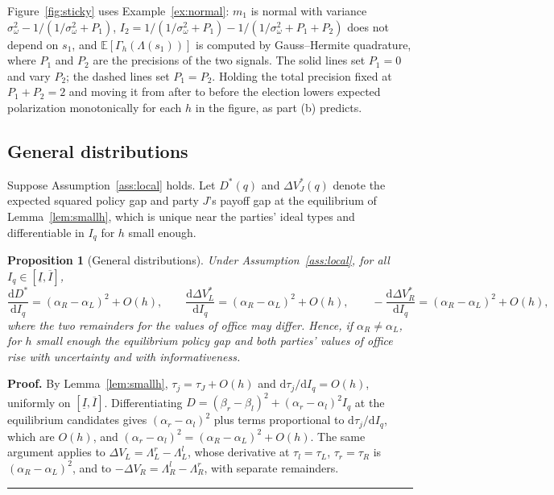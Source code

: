 \documentclass[12pt,letterpaper]{article}
\newtheorem{proposition}{Proposition}
\newenvironment{proof}[1][Proof]{\noindent\textbf{#1.} }{\ \rule{0.5em}{0.5em}}
\begin{document}
Figure~\ref{fig:sticky} uses Example~\ref{ex:normal}: $m_1$ is normal with variance $\sigma_\omega^2-1/(1/\sigma_\omega^2+P_1)$, $I_2=1/(1/\sigma_\omega^2+P_1)-1/(1/\sigma_\omega^2+P_1+P_2)$ does not depend on $s_1$, and $\mathbb{E}[\Gamma_h(\Lambda(s_1))]$ is computed by Gauss--Hermite quadrature, where $P_1$ and $P_2$ are the precisions of the two signals. The solid lines set $P_1=0$ and vary $P_2$; the dashed lines set $P_1=P_2$. Holding the total precision fixed at $P_1+P_2=2$ and moving it from after to before the election lowers expected polarization monotonically for each $h$ in the figure, as part (b) predicts.

\subsection*{General distributions}

Suppose Assumption~\ref{ass:local} holds. Let $D^*(q)$ and $\Delta V_J^*(q)$ denote the expected squared policy gap and party $J$'s payoff gap at the equilibrium of Lemma~\ref{lem:smallh}, which is unique near the parties' ideal types and differentiable in $I_q$ for $h$ small enough.

\begin{proposition}[General distributions]\label{prop:general}
Under Assumption~\ref{ass:local}, for all $I_q\in[\underline I,\overline I]$,
\begin{equation}\label{eq:general}
\frac{\mathrm{d}D^*}{\mathrm{d}I_q}=(\alpha_R-\alpha_L)^2+O(h),
\qquad
\frac{\mathrm{d}\Delta V_L^*}{\mathrm{d}I_q}=(\alpha_R-\alpha_L)^2+O(h),
\qquad
-\frac{\mathrm{d}\Delta V_R^*}{\mathrm{d}I_q}=(\alpha_R-\alpha_L)^2+O(h),
\end{equation}
where the two remainders for the values of office may differ. Hence, if $\alpha_R\ne\alpha_L$, for $h$ small enough the equilibrium policy gap and both parties' values of office rise with uncertainty and with informativeness.
\end{proposition}

\begin{proof}
By Lemma~\ref{lem:smallh}, $\tau_j=\tau_J+O(h)$ and $\mathrm{d}\tau_j/\mathrm{d}I_q=O(h)$, uniformly on $[\underline I,\overline I]$. Differentiating $D=(\beta_r-\beta_l)^2+(\alpha_r-\alpha_l)^2I_q$ at the equilibrium candidates gives $(\alpha_r-\alpha_l)^2$ plus terms proportional to $\mathrm{d}\tau_j/\mathrm{d}I_q$, which are $O(h)$, and $(\alpha_r-\alpha_l)^2=(\alpha_R-\alpha_L)^2+O(h)$. The same argument applies to $\Delta V_L=\Lambda_L^r-\Lambda_L^l$, whose derivative at $\tau_l=\tau_L$, $\tau_r=\tau_R$ is $(\alpha_R-\alpha_L)^2$, and to $-\Delta V_R=\Lambda_R^l-\Lambda_R^r$, with separate remainders.
\end{proof}
\end{document}
